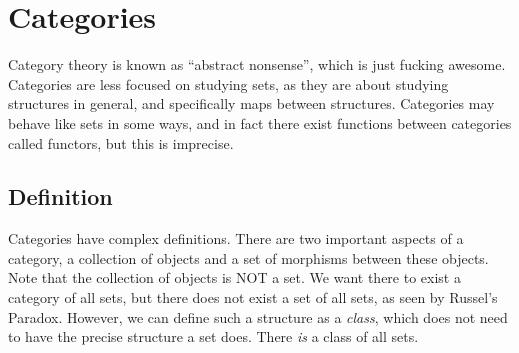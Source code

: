 \section{Categories}
Category theory is known as ``abstract nonsense'', which is just fucking awesome. Categories are less focused on studying sets, as they are about studying structures in general, and specifically maps between structures. Categories may behave like sets in some ways, and in fact there exist functions between categories called functors, but this is imprecise.
\subsection{Definition}
Categories have complex definitions. There are two important aspects of a category, a collection of objects and a set of morphisms between these objects. Note that the collection of objects is NOT a set. We want there to exist a category of all sets, but there does not exist a set of all sets, as seen by Russel's Paradox. However, we can define such a structure as a \emph{class}, which does not need to have the precise structure a set does. There \emph{is} a class of all sets.

